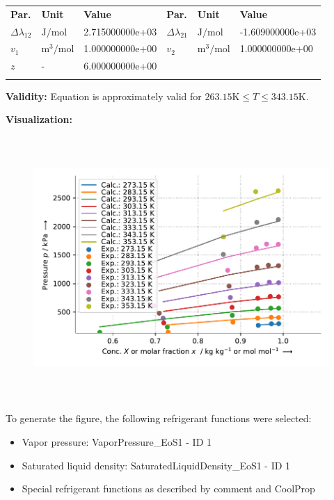 \begin{longtable}[l]{lll|lll}
\toprule
\addlinespace
\textbf{Par.} & \textbf{Unit} & \textbf{Value} &	\textbf{Par.} & \textbf{Unit} & \textbf{Value} \\
\addlinespace
\midrule
\endhead

\bottomrule
\endfoot
\bottomrule
\endlastfoot
\addlinespace

$\Delta\lambda_{12}$ & $\si{\joule\per\mole}$ & 2.715000000e+03 & $\Delta\lambda_{21}$ & $\si{\joule\per\mole}$ & -1.609000000e+03 \\
$v_1$ & $\si{\cubic\meter\per\mole}$ & 1.000000000e+00 & $v_2$ & $\si{\cubic\meter\per\mole}$ & 1.000000000e+00 \\
$z$ & - & 6.000000000e+00 & & & \\

\addlinespace\end{longtable}

\textbf{Validity:}
\newline
Equation is approximately valid for $263.15 \si{\kelvin} \leq T \leq 343.15 \si{\kelvin}$.
\newline

\textbf{Visualization:}
%
\begin{figure}[!htp]
{\noindent\includegraphics[height=10cm, keepaspectratio]{figs/abs/abs_R-134a_lubricant_PAG_WangChao_1.pdf}}
\end{figure}
%

To generate the figure, the following refrigerant functions were selected:
\begin{itemize}
\item Vapor pressure: VaporPressure\_EoS1 - ID 1
\item Saturated liquid density: SaturatedLiquidDensity\_EoS1 - ID 1
\item Special refrigerant functions as described by comment and CoolProp
\end{itemize}

